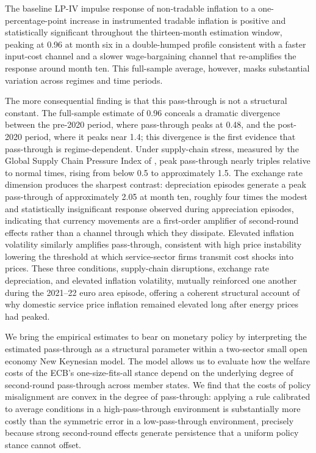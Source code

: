 \documentclass[a4paper,12pt]{article}
\begin{document}
The baseline LP-IV impulse response of non-tradable inflation to a one-percentage-point increase in instrumented tradable inflation is positive and statistically significant throughout the thirteen-month estimation window, peaking at 0.96 at month six in a double-humped profile consistent with a faster input-cost channel and a slower wage-bargaining channel that re-amplifies the response around month ten. This full-sample average, however, masks substantial variation across regimes and time periods.

The more consequential finding is that this pass-through is not a structural constant. The full-sample estimate of 0.96 conceals a dramatic divergence between the pre-2020 period, where pass-through peaks at 0.48, and the post-2020 period, where it peaks near 1.4; this divergence is the first evidence that pass-through is regime-dependent. Under supply-chain stress, measured by the Global Supply Chain Pressure Index of , peak pass-through nearly triples relative to normal times, rising from below 0.5 to approximately 1.5. The exchange rate dimension produces the sharpest contrast: depreciation episodes generate a peak pass-through of approximately 2.05 at month ten, roughly four times the modest and statistically insignificant response observed during appreciation episodes, indicating that currency movements are a first-order amplifier of second-round effects rather than a channel through which they dissipate. Elevated inflation volatility similarly amplifies pass-through, consistent with high price instability lowering the threshold at which service-sector firms transmit cost shocks into prices. These three conditions, supply-chain disruptions, exchange rate depreciation, and elevated inflation volatility, mutually reinforced one another during the 2021--22 euro area episode, offering a coherent structural account of why domestic service price inflation remained elevated long after energy prices had peaked.

We bring the empirical estimates to bear on monetary policy by interpreting the estimated pass-through as a structural parameter within a two-sector small open economy New Keynesian model. The model allows us to evaluate how the welfare costs of the ECB's one-size-fits-all stance depend on the underlying degree of second-round pass-through across member states. We find that the costs of policy misalignment are convex in the degree of pass-through: applying a rule calibrated to average conditions in a high-pass-through environment is substantially more costly than the symmetric error in a low-pass-through environment, precisely because strong second-round effects generate persistence that a uniform policy stance cannot offset.
\end{document}
